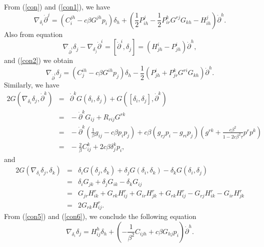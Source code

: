\documentclass[10pt,a4paper]{article}
\theoremstyle{plain}
\theoremstyle{definition}
\begin{document}
From (\ref{con}) and (\ref{con1}), we have
\begin{equation}
\nabla_{\delta_i}{\dot{\partial}}^j=(C^{jh}_i-c\beta
G^{jh}p_i)\delta_h+(\frac{1}{2}P^j_{ih}-\frac{1}{2}P^k_{ir}G^{rj}G_{kh}-H^j_{ih}){\dot{\partial}}^h.\label{con2}
\end{equation}
Also from equation
\[
\nabla_{{\dot{\partial}}^i}{\delta_j}-\nabla_{\delta_j}{\dot{\partial}}^i=[{\dot{\partial}}^i,\delta_j]
=(H^i_{jh}-P^i_{jh}){\dot{\partial}}^h,
\]
and (\ref{con2}) we obtain
\begin{equation}
\nabla_{{\dot{\partial}}^i}{\delta_j}=(C^{ih}_j-c\beta
G^{ih}p_j)\delta_h-\frac{1}{2}(P^i_{jh}+P^k_{jr}G^{ri}G_{kh}){\dot{\partial}}^h.\label{con4}
\end{equation}
Similarly, we have
\begin{eqnarray}
2G(\nabla_{\delta_i}\delta_j,{\dot{\partial}}^k)\!\!\!\!&=&\!\!\!\!{\dot{\partial}}^kG(\delta_i,\delta_j)
+G([\delta_i,\delta_j],{\dot{\partial}}^k)\nonumber\\
\!\!\!\!&=&\!\!\!\!-{\dot{\partial}}^kG_{ij}+R_{rij}G^{rk}\nonumber\\
\!\!\!\!&=&\!\!\!\!-{\dot{\partial}}^k(\frac{1}{\beta}g_{ij}-c\beta p_ip_j)+c\beta(g_{rj}p_i-g_{ri}p_j)( g^{rk}+\frac{c\beta^2}{1-2c\beta^2\tau}p^rp^k)\nonumber\\
\!\!\!\!&=&\!\!\!\!-\frac{2}{\beta}C^k_{ij}+2c\beta\delta^k_jp_i,\label{con5}
\end{eqnarray}
and
\begin{eqnarray}
2G(\nabla_{\delta_i}\delta_j,\delta_k)\!\!\!\!&=&\!\!\!\!\delta_iG(\delta_j,\delta_k)+\delta_jG(\delta_i,\delta_k)-\delta_kG(\delta_i,\delta_j)\nonumber\\
\!\!\!\!&=&\!\!\!\!\delta_iG_{jk}+\delta_jG_{ik}-\delta_kG_{ij}\nonumber\\
\!\!\!\!&=&\!\!\!\!G_{jr}H^r_{ik}+G_{rk}H^r_{ij}+G_{ir}H^r_{jk}+G_{rk}H^r_{ij}-G_{rj}H^r_{ik}-G_{ir}H^r_{jk}\nonumber\\
\!\!\!\!&=&\!\!\!\!2G_{rk}H^r_{ij}.\label{con6}
\end{eqnarray}
From (\ref{con5}) and (\ref{con6}), we conclude the following equation
\begin{equation}
\nabla_{\delta_i}\delta_j=H^h_{ij}\delta_h+(-\frac{1}{\beta^2}C_{ijh}+c\beta
G_{hj}p_i){\dot{\partial}}^h.\label{con9}
\end{equation}
\end{document}
